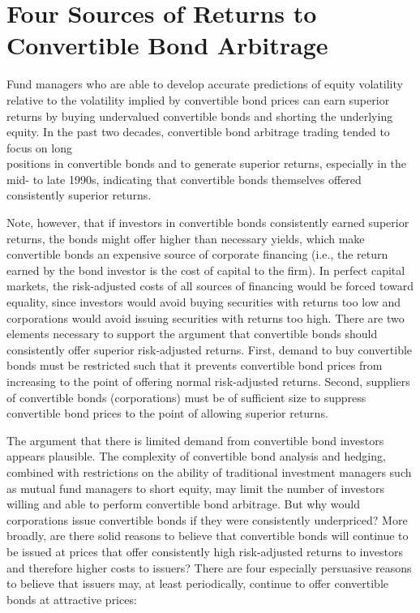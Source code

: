 \documentclass[11pt]{article}
\begin{document}
\section*{Four Sources of Returns to Convertible Bond Arbitrage}
Fund managers who are able to develop accurate predictions of equity volatility relative to the volatility implied by convertible bond prices can earn superior returns by buying undervalued convertible bonds and shorting the underlying equity. In the past two decades, convertible bond arbitrage trading tended to focus on long\\
positions in convertible bonds and to generate superior returns, especially in the mid- to late 1990s, indicating that convertible bonds themselves offered consistently superior returns.

Note, however, that if investors in convertible bonds consistently earned superior returns, the bonds might offer higher than necessary yields, which make convertible bonds an expensive source of corporate financing (i.e., the return earned by the bond investor is the cost of capital to the firm). In perfect capital markets, the risk-adjusted costs of all sources of financing would be forced toward equality, since investors would avoid buying securities with returns too low and corporations would avoid issuing securities with returns too high. There are two elements necessary to support the argument that convertible bonds should consistently offer superior risk-adjusted returns. First, demand to buy convertible bonds must be restricted such that it prevents convertible bond prices from increasing to the point of offering normal risk-adjusted returns. Second, suppliers of convertible bonds (corporations) must be of sufficient size to suppress convertible bond prices to the point of allowing superior returns.

The argument that there is limited demand from convertible bond investors appears plausible. The complexity of convertible bond analysis and hedging, combined with restrictions on the ability of traditional investment managers such as mutual fund managers to short equity, may limit the number of investors willing and able to perform convertible bond arbitrage. But why would corporations issue convertible bonds if they were consistently underpriced? More broadly, are there solid reasons to believe that convertible bonds will continue to be issued at prices that offer consistently high risk-adjusted returns to investors and therefore higher costs to issuers? There are four especially persuasive reasons to believe that issuers may, at least periodically, continue to offer convertible bonds at attractive prices:
\end{document}
